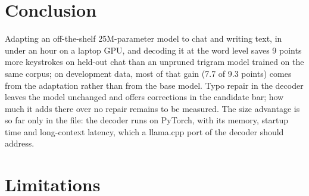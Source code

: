 \documentclass[11pt]{article}
\begin{document}
\section{Conclusion}

Adapting an off-the-shelf 25M-parameter model to chat and writing text, in under an hour on a laptop GPU, and
decoding it at the word level saves 9 points more keystrokes on held-out chat than an unpruned trigram model trained
on the same corpus; on development data, most of that gain (7.7 of 9.3 points) comes from the adaptation rather than
from the base model. Typo repair in the decoder leaves the model unchanged and offers corrections in the candidate
bar; how much it adds there over no repair remains to be measured. The size advantage is so far only in the file: the decoder runs on PyTorch, with
its memory, startup time and long-context latency, which a llama.cpp port of the decoder should address.

\section*{Limitations}
\end{document}
